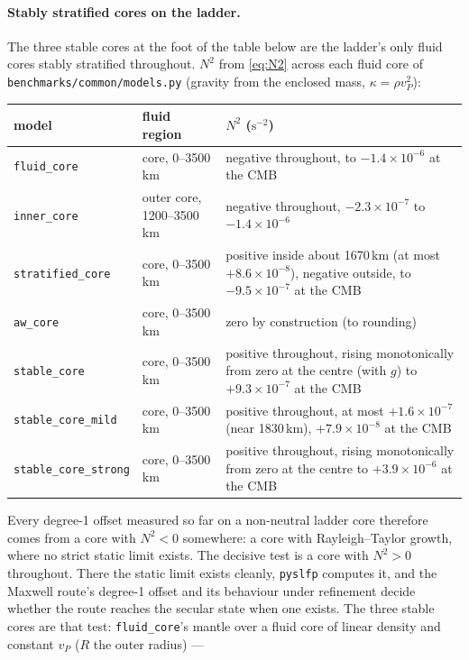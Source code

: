 \documentclass[11pt]{article}
\newcommand{\code}[1]{\texttt{#1}}
\begin{document}
\paragraph{Stably stratified cores on the ladder.} The three stable
cores at the foot of the table below are the ladder's only fluid cores
stably stratified throughout. $N^2$ from \eqref{eq:N2} across each fluid
core of \code{benchmarks/common/models.py} (gravity from the enclosed
mass, $\kappa = \rho v_P^2$):
\begin{center}
\small
\begin{tabular}{@{}llp{7.2cm}@{}}
\toprule
model & fluid region & $N^2$ ($\mathrm{s}^{-2}$) \\
\midrule
\code{fluid\_core} & core, 0--3500\,km & negative throughout, to
$-1.4\times10^{-6}$ at the CMB \\
\code{inner\_core} & outer core, 1200--3500\,km & negative throughout,
$-2.3\times10^{-7}$ to $-1.4\times10^{-6}$ \\
\code{stratified\_core} & core, 0--3500\,km & positive inside about
1670\,km (at most $+8.6\times10^{-8}$), negative outside, to
$-9.5\times10^{-7}$ at the CMB \\
\code{aw\_core} & core, 0--3500\,km & zero by construction (to
rounding) \\
\code{stable\_core} & core, 0--3500\,km & positive throughout, rising
monotonically from zero at the centre (with $g$) to
$+9.3\times10^{-7}$ at the CMB \\
\code{stable\_core\_mild} & core, 0--3500\,km & positive throughout,
at most $+1.6\times10^{-7}$ (near 1830\,km), $+7.9\times10^{-8}$ at the
CMB \\
\code{stable\_core\_strong} & core, 0--3500\,km & positive throughout,
rising monotonically from zero at the centre to $+3.9\times10^{-6}$ at
the CMB \\
\bottomrule
\end{tabular}
\end{center}
Every degree-1 offset measured so far on a non-neutral ladder core
therefore comes from a core with $N^2 < 0$ somewhere: a core with
Rayleigh--Taylor growth, where no strict static limit exists. The
decisive test is a core with $N^2 > 0$ throughout. There the static
limit exists cleanly, \code{pyslfp} computes it, and the Maxwell
route's degree-1 offset and its behaviour under refinement decide
whether the route reaches the secular state when one exists. The three
stable cores are that test: \code{fluid\_core}'s mantle over a fluid
core of linear density and constant $v_P$ ($R$ the outer radius) ---
\end{document}
